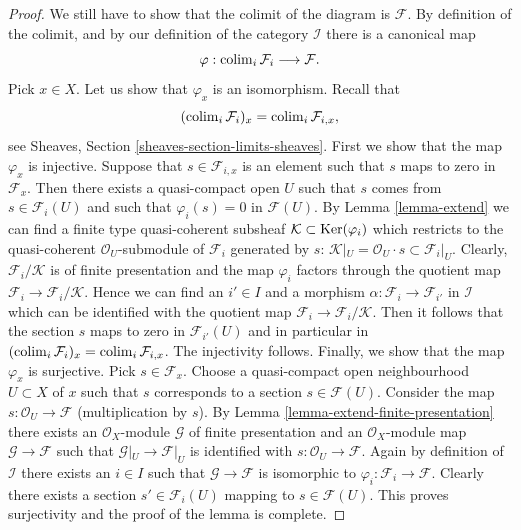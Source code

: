 \begin{proof}
\medskip\noindent
We still have to show that the colimit of the diagram is $\mathcal{F}$.
By definition of the colimit, and by our definition of the category
$\mathcal{I}$ there is a canonical map
$$
\varphi :
\mathop{\mathrm{colim}}\nolimits_i \mathcal{F}_i
\longrightarrow
\mathcal{F}.
$$
Pick $x \in X$. Let us show that $\varphi_x$ is an isomorphism.
Recall that
$$
(\mathop{\mathrm{colim}}\nolimits_i \mathcal{F}_i)_x
=
\mathop{\mathrm{colim}}\nolimits_i \mathcal{F}_{i, x},
$$
see
Sheaves, Section \ref{sheaves-section-limits-sheaves}.
First we show that the map $\varphi_x$ is injective.
Suppose that $s \in \mathcal{F}_{i, x}$ is an element
such that $s$ maps to zero in $\mathcal{F}_x$. Then there exists
a quasi-compact open $U$ such that $s$ comes from $s \in \mathcal{F}_i(U)$
and such that $\varphi_i(s) = 0$ in $\mathcal{F}(U)$.
By Lemma \ref{lemma-extend}
we can find a finite type quasi-coherent subsheaf
$\mathcal{K} \subset \mathop{\mathrm{Ker}}(\varphi_i)$ which restricts to
the quasi-coherent $\mathcal{O}_U$-submodule of $\mathcal{F}_i$
generated by $s$:
$\mathcal{K}|_U = \mathcal{O}_U\cdot s \subset \mathcal{F}_i|_U$.
Clearly, $\mathcal{F}_i/\mathcal{K}$ is of finite presentation and
the map $\varphi_i$ factors through the quotient map
$\mathcal{F}_i \to \mathcal{F}_i/\mathcal{K}$. Hence we can find
an $i' \in I$ and a morphism $\alpha : \mathcal{F}_i \to \mathcal{F}_{i'}$
in $\mathcal{I}$ which can be identified with the quotient map
$\mathcal{F}_i \to \mathcal{F}_i/\mathcal{K}$. Then it follows
that the section $s$ maps to zero in $\mathcal{F}_{i'}(U)$ and
in particular in
$(\mathop{\mathrm{colim}}\nolimits_i \mathcal{F}_i)_x =
\mathop{\mathrm{colim}}\nolimits_i \mathcal{F}_{i, x}$.
The injectivity follows.
Finally, we show that the map $\varphi_x$ is surjective.
Pick $s \in \mathcal{F}_x$. Choose a quasi-compact open neighbourhood
$U \subset X$ of $x$ such that $s$ corresponds to a section
$s \in \mathcal{F}(U)$. Consider the map
$s : \mathcal{O}_U \to \mathcal{F}$ (multiplication by $s$).
By Lemma \ref{lemma-extend-finite-presentation}
there exists an $\mathcal{O}_X$-module $\mathcal{G}$
of finite presentation and an $\mathcal{O}_X$-module map
$\mathcal{G} \to \mathcal{F}$ such that $\mathcal{G}|_U \to \mathcal{F}|_U$
is identified with
$s : \mathcal{O}_U \to \mathcal{F}$.
Again by definition of $\mathcal{I}$ there exists an $i \in I$
such that $\mathcal{G} \to \mathcal{F}$ is isomorphic to
$\varphi_i : \mathcal{F}_i \to \mathcal{F}$. Clearly there exists
a section $s' \in \mathcal{F}_i(U)$ mapping to $s \in \mathcal{F}(U)$.
This proves surjectivity and the proof of the lemma is complete.
\end{proof}

